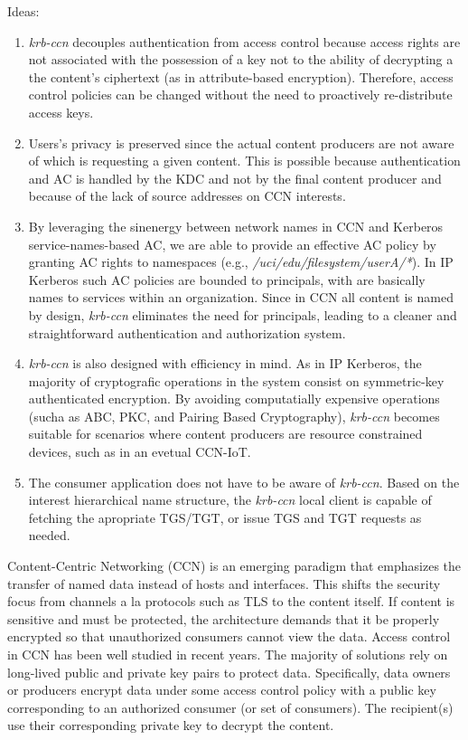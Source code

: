 \documentclass[conference]{IEEEtran}
\begin{document}
Ideas:
\begin{enumerate}
  \item \emph{krb-ccn} decouples authentication from access control because access rights
	are not associated with the possession of a key not to the ability of decrypting a
	the content's ciphertext (as in attribute-based encryption). Therefore, access control
	policies can be changed without the need to proactively re-distribute access keys.
  \item Users's privacy is preserved since the actual content producers are not aware of which
	is requesting a given content. This is possible because authentication and AC is handled
	by the KDC and not by the final content producer and because of the lack of source addresses
	on CCN interests.
  \item By leveraging the sinenergy between network names in CCN and Kerberos service-names-based AC, we are
	able to provide an effective AC policy by granting AC rights to namespaces (e.g., \emph{/uci/edu/filesystem/userA/*}).
	In IP Kerberos such AC policies are bounded to principals, with are basically names to services within an organization.
	Since in CCN all content is named by design, \emph{krb-ccn} eliminates the need for principals, leading to a cleaner and
	straightforward authentication and authorization system.
  \item \emph{krb-ccn} is also designed with efficiency in mind. As in IP Kerberos, the majority of cryptografic operations in the
	system consist on symmetric-key authenticated encryption. By avoiding computatially expensive operations (sucha as ABC, PKC, and Pairing Based Cryptography),
	\emph{krb-ccn} becomes suitable for scenarios where content producers are resource constrained devices, such as in an evetual CCN-IoT.
  \item The consumer application does not have to be aware of \emph{krb-ccn}. Based on the interest hierarchical name structure,
	the \emph{krb-ccn} local client is capable of fetching the apropriate TGS/TGT, or issue TGS and TGT requests as needed.
\end{enumerate}


Content-Centric Networking (CCN) is an emerging paradigm that emphasizes the transfer
of named data instead of hosts and interfaces. This shifts the security focus from
channels a la protocols such as TLS to the content itself. If content is sensitive
and must be protected, the architecture demands that it be properly encrypted so
that unauthorized consumers cannot view the data. Access control in CCN has been
well studied in recent years. The majority of solutions rely on long-lived public
and private key pairs to protect data. Specifically, data owners or producers
encrypt data under some access control policy with a public key corresponding to
an authorized consumer (or set of consumers). The recipient(s) use their
corresponding private key to decrypt the content.
\end{document}
